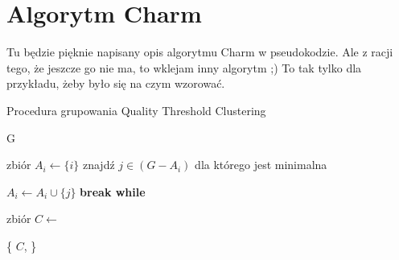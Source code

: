\section{Algorytm Charm}

Tu będzie pięknie napisany opis algorytmu Charm w pseudokodzie.
Ale z racji tego, że jeszcze go nie ma, to wklejam inny algorytm ;) To tak tylko dla przykładu, żeby było się na czym wzorować.

\begin{algorithm}
\caption{Procedura grupowania Quality Threshold Clustering}
\label{AlgQTC}
\begin{algorithmic}
		\Return G \EndIf
		
			 \State zbiór $A_{i} \gets \{ i \}$ 
			 	\State znajdź $j \in ( G - A_{i} )$ dla którego  jest minimalna
			 	
			 		\State $A_{i} \gets A_{i} \cup \{j\}$
			 	\Else
			 		\State \textbf{break while}
			 	\EndIf
	
			 \EndWhile
		\EndFor
		
		\State zbiór $C \gets$ 
		
		\State \Return \{ $C$,  \}

	\EndFunction
\end{algorithmic}
\end{algorithm}




